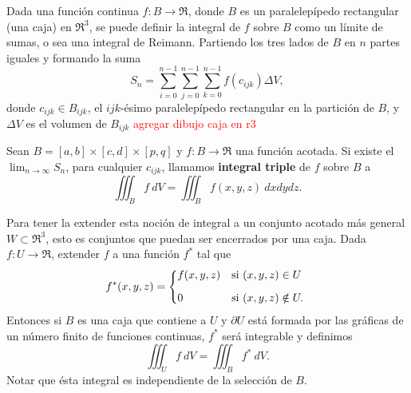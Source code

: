 Dada una funci\'on continua $f:B\to\Re$, donde $B$ es un paralelep\'ipedo rectangular (una caja) en $\Re^3$, se puede definir la integral de $f$ sobre $B$ como un l\'imite de sumas, o sea una integral de Reimann. Partiendo los tres lados de $B$ en $n$ partes iguales y formando la suma
\[
    S_n=\sum_{i=0}^{n-1}\sum_{j=0}^{n-1}\sum_{k=0}^{n-1}f(c_{ijk})\Delta V,
\]  
donde $c_{ijk}\in B_{ijk}$, el $ijk$-\'esimo paralelep\'ipedo rectangular en la partici\'on de $B$, y $\Delta V$ es el volumen de $B_{ijk}$
\textcolor{red}{agregar dibujo caja en r3}

\begin{definition} 
    Sean $B=[a,b]\times[c,d]\times[p,q]$ y $f:B\to\Re$ una funci\'on acotada. Si existe el $\lim_{n\to\infty}S_n$, para cualquier $c_{ijk}$, llamamos \textbf{integral triple} de $f$ sobre $B$ a
    \[
          \iiint_B f\:dV=\iiint_B f(x,y,z)\:dxdydz.
    \]
\end{definition}

Para tener la extender esta noci\'on de integral a un conjunto acotado m\'as general $W\subset\Re^3$, esto es conjuntos que puedan ser encerrados por una caja. Dada $f:U\to\Re$, extender $f$ a una funci\'on $f^*$ tal que
\[
    f^*(x,y,z)=
    \begin{dcases*}
        f(x,y,z) & si $(x,y,z)\in U$ \\[.2cm]
        0        & si $(x,y,z)\notin U.$
    \end{dcases*}
\]
Entonces si $B$ es una caja que contiene a $U$ y $\partial U$ est\'a formada por las gr\'aficas de un n\'umero finito de funciones continuas, %
$f^*$ ser\'a integrable y definimos
\[
    \iiint_U f\:dV=\iiint_B f^*\:dV.  
\]
Notar que \'esta integral es independiente de la selecci\'on de $B$.

